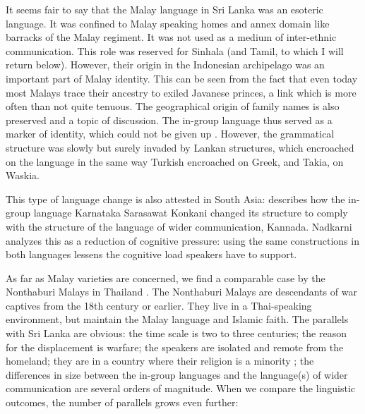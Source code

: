 \documentclass[a4paper,10pt]{article}
\begin{document}
It seems fair to say that the Malay language in Sri Lanka was an esoteric language. It was confined to Malay speaking homes and annex domain like barracks of the Malay regiment. It was not used as a medium of inter-ethnic communication. This role was reserved for Sinhala (and Tamil, to which I will return below). However, their origin in the Indonesian archipelago was an important part of Malay identity. This can be seen from the fact that even today most Malays trace their ancestry to exiled Javanese princes, a link which is more often than not quite tenuous. The geographical origin of family names is also preserved and a topic of discussion. The in-group language thus served as a marker of identity, which could not be given up \citep[cf.][]{Rassool2010}. However, the grammatical structure was slowly but surely invaded by Lankan structures, which encroached on the language in the same way Turkish encroached on Greek, and Takia, on Waskia.

This type of language change is also attested in South Asia: \citet{Nadkarni1975} describes how the in-group language Karnataka Sarasawat Konkani changed its structure to comply with the structure of the language of wider communication, Kannada. Nadkarni analyzes this as a reduction of cognitive pressure: using the same constructions in both languages lessens the cognitive load speakers have to support.

As far as Malay varieties are concerned, we find a comparable case by the Nonthaburi Malays in Thailand \citep{Tadmor1992,Tadmor1995phd,Tadmor2004}. The Nonthaburi Malays are descendants of war captives from the 18th century or earlier. They live in a Thai-speaking environment, but maintain the Malay language and Islamic faith. The parallels with Sri Lanka are obvious: the time scale is two to three  centuries; the reason for the displacement is warfare; the speakers are isolated and remote from the homeland; they are in a country where their religion is a minority \citep[527]{Tadmor2004}; the differences in size between the in-group languages and the language(s) of wider communication are several orders of magnitude. When we compare the linguistic outcomes, the number of parallels grows even further:

\end{document}
